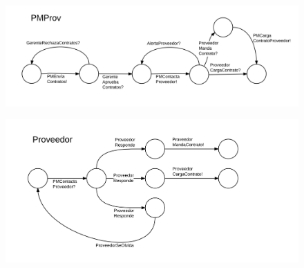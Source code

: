 \begin{figure}[H]
\includegraphics[width=\linewidth]{diag/viejos/f5.png}
\end{figure}
\begin{figure}[H]
\includegraphics[width=\linewidth]{diag/viejos/f6.png}
\end{figure}
